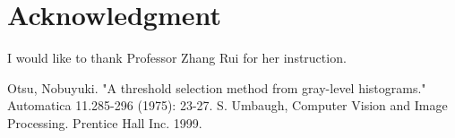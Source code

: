 \documentclass[journal,comsoc]{IEEEtran}
\begin{document}
\section*{Acknowledgment}
I would like to thank Professor Zhang Rui for her instruction.

\begin{thebibliography}{1}
  Otsu, Nobuyuki. "A threshold selection method from gray-level histograms." Automatica 11.285-296 (1975): 23-27.
  S. Umbaugh, Computer Vision and Image Processing. Prentice Hall Inc. 1999.
\end{thebibliography}


\vfill
\end{document}
